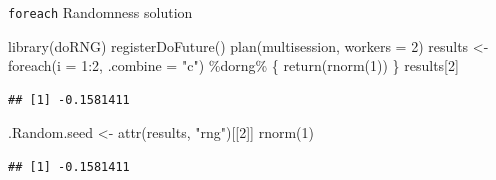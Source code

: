 \documentclass[
  ignorenonframetext,
  usenames,
  dvipsnames]{beamer}
\newenvironment{Shaded}{\begin{snugshade}}{\end{snugshade}}
\newcommand{\AttributeTok}[1]{\textcolor[rgb]{0.77,0.63,0.00}{#1}}
\newcommand{\DecValTok}[1]{\textcolor[rgb]{0.00,0.00,0.81}{#1}}
\newcommand{\FunctionTok}[1]{\textcolor[rgb]{0.00,0.00,0.00}{#1}}
\newcommand{\NormalTok}[1]{#1}
\newcommand{\OtherTok}[1]{\textcolor[rgb]{0.56,0.35,0.01}{#1}}
\newcommand{\SpecialCharTok}[1]{\textcolor[rgb]{0.00,0.00,0.00}{#1}}
\newcommand{\StringTok}[1]{\textcolor[rgb]{0.31,0.60,0.02}{#1}}
\begin{document}
\begin{frame}[fragile]{\texttt{foreach} Randomness solution}
\protect\hypertarget{foreach-randomness-solution}{}
\small

\begin{Shaded}
\begin{Highlighting}[]
\FunctionTok{library}\NormalTok{(doRNG)}
\FunctionTok{registerDoFuture}\NormalTok{()}
\FunctionTok{plan}\NormalTok{(multisession, }\AttributeTok{workers =} \DecValTok{2}\NormalTok{)}
\NormalTok{results }\OtherTok{\textless{}{-}} \FunctionTok{foreach}\NormalTok{(}\AttributeTok{i =} \DecValTok{1}\SpecialCharTok{:}\DecValTok{2}\NormalTok{, }\AttributeTok{.combine =} \StringTok{"c"}\NormalTok{) }\SpecialCharTok{\%dorng\%}\NormalTok{ \{}
  \FunctionTok{return}\NormalTok{(}\FunctionTok{rnorm}\NormalTok{(}\DecValTok{1}\NormalTok{))}
\NormalTok{\}}
\NormalTok{results[}\DecValTok{2}\NormalTok{]}
\end{Highlighting}
\end{Shaded}

\begin{verbatim}
## [1] -0.1581411
\end{verbatim}

\begin{Shaded}
\begin{Highlighting}[]
\NormalTok{.Random.seed }\OtherTok{\textless{}{-}} \FunctionTok{attr}\NormalTok{(results, }\StringTok{"rng"}\NormalTok{)[[}\DecValTok{2}\NormalTok{]]}
\FunctionTok{rnorm}\NormalTok{(}\DecValTok{1}\NormalTok{)}
\end{Highlighting}
\end{Shaded}

\begin{verbatim}
## [1] -0.1581411
\end{verbatim}

\normalsize
\end{frame}
\end{document}
